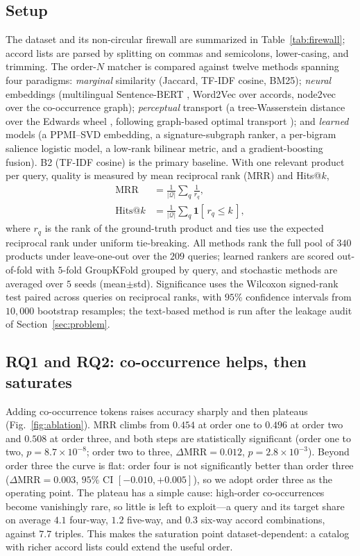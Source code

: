 \documentclass[conference]{IEEEtran}
\begin{document}
\subsection{Setup}
The dataset and its non-circular firewall are summarized in Table~\ref{tab:firewall}; accord
lists are parsed by splitting on commas and semicolons, lower-casing, and trimming. The
order-$N$ matcher is compared against twelve methods spanning four paradigms: \emph{marginal}
similarity (Jaccard, TF-IDF cosine, BM25); \emph{neural} embeddings (multilingual
Sentence-BERT \cite{r22}, Word2Vec over accords, node2vec over the co-occurrence graph);
\emph{perceptual} transport (a tree-Wasserstein distance over the Edwards wheel \cite{r10},
following graph-based optimal transport \cite{r7,r9});
and \emph{learned} models (a PPMI--SVD embedding, a signature-subgraph ranker, a per-bigram
salience logistic model, a low-rank bilinear metric, and a gradient-boosting fusion). B2
(TF-IDF cosine) is the primary baseline. With one relevant product per query, quality is
measured by mean reciprocal rank (MRR) and Hits@$k$,
\begin{align}
\mathrm{MRR}&=\frac{1}{|\mathcal{Q}|}\sum_{q}\frac{1}{r_q},\\
\mathrm{Hits}@k&=\frac{1}{|\mathcal{Q}|}\sum_{q}\mathbf{1}[\,r_q\le k\,],\label{eq:metrics}
\end{align}
where $r_q$ is the rank of the ground-truth product and ties use the expected reciprocal rank
under uniform tie-breaking. All methods rank the full pool of $340$ products under
leave-one-out over the $209$ queries; learned rankers are scored out-of-fold with $5$-fold
GroupKFold grouped by query, and stochastic methods are averaged over $5$ seeds
(mean$\pm$std). Significance uses the Wilcoxon signed-rank test paired across queries on
reciprocal ranks, with $95\%$ confidence intervals from $10{,}000$ bootstrap resamples; the
text-based method is run after the leakage audit of Section~\ref{sec:problem}.

\subsection{RQ1 and RQ2: co-occurrence helps, then saturates}
Adding co-occurrence tokens raises accuracy sharply and then plateaus
(Fig.~\ref{fig:ablation}). MRR climbs from $0.454$ at order one to $0.496$ at order two and
$0.508$ at order three, and both steps are statistically significant (order one to two,
$p=8.7\times10^{-8}$; order two to three, $\Delta\mathrm{MRR}=0.012$, $p=2.8\times10^{-3}$). Beyond order three the curve is flat:
order four is not significantly better than order three ($\Delta\mathrm{MRR}=0.003$, $95\%$
CI $[-0.010,+0.005]$), so we adopt order three as the operating point. The plateau has a
simple cause: high-order co-occurrences become vanishingly rare, so little is left to
exploit---a query and its target share on average $4.1$ four-way, $1.2$ five-way, and $0.3$
six-way accord combinations, against $7.7$ triples. This makes the saturation point
dataset-dependent: a catalog with richer accord lists could extend the useful order.
\end{document}
